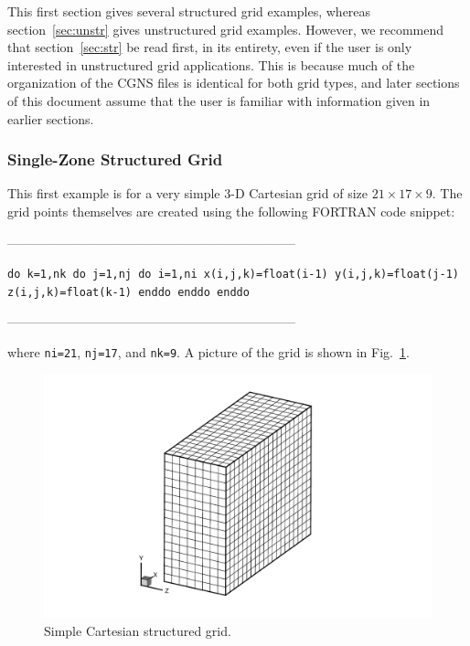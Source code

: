\documentclass[12pt]{article}
\begin{document}
This first section gives several structured grid examples, whereas
section~\ref{sec:unstr} gives unstructured grid examples.  However,
we recommend that section~\ref{sec:str} be read first, in its entirety,
even if the user is only interested in unstructured grid
applications.  This is because much of the organization of the
CGNS files is identical for both grid types, and later sections
of this document assume that the user is familiar with information
given in earlier sections.

\subsubsection{Single-Zone Structured Grid} \label{sec:singlegrid}

This first example is for a very simple 3-D Cartesian grid of size
$21 \times 17 \times 9$.  The grid points themselves are created
using the following FORTRAN code snippet:

--------------------------------------------------------------------

{\tt \indent         do k=1,nk
\newline\indent\indent           do j=1,nj
\newline\indent\indent\indent             do i=1,ni
\newline\indent\indent\indent\indent               x(i,j,k)=float(i-1)
\newline\indent\indent\indent\indent               y(i,j,k)=float(j-1)
\newline\indent\indent\indent\indent               z(i,j,k)=float(k-1)
\newline\indent\indent\indent             enddo
\newline\indent\indent           enddo
\newline\indent         enddo}

--------------------------------------------------------------------

\noindent where {\tt ni=21}, {\tt nj=17}, and {\tt nk=9}.  
A picture of the grid is shown in
Fig.~\ref{FIGgrid_cartesian}.

\begin{figure}[hpbt]
\centerline{{\includegraphics[width=120mm]{figures/grid_cartesian}}}
\caption{Simple Cartesian structured grid.}
\label{FIGgrid_cartesian}
\end{figure}
%
\end{document}
